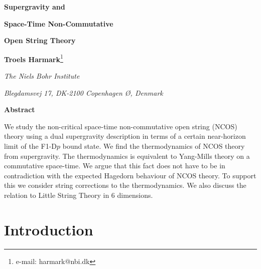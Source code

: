\documentclass[a4paper,twoside,titlepage,12pt]{article}
\begin{document}
\begin{titlepage}

\vskip 2cm

\centerline{\Large \bf Supergravity and}
\vskip 0.2cm
\centerline{\Large \bf Space-Time Non-Commutative}
\vskip 0.2cm
\centerline{\Large \bf Open String Theory}
\vskip 0.2cm

\vskip 1.7cm
\centerline{{\bf Troels Harmark}\footnote{e-mail: harmark@nbi.dk} }
\vskip 0.3cm
\centerline{\sl The Niels Bohr Institute}
\centerline{\sl Blegdamsvej 17, DK-2100 Copenhagen \O, Denmark}
\vskip 2cm
\centerline{\bf Abstract}
\vskip 0.4cm

\noindent

We study the non-critical space-time non-commutative open string  
(NCOS) theory using a dual supergravity description in terms of 
a certain near-horizon limit of the F1-D$p$ bound state.
We find the thermodynamics of NCOS theory from supergravity. 
The thermodynamics is equivalent to Yang-Mills theory 
on a commutative space-time.
We argue that this fact does not have to be in contradiction with the
expected Hagedorn behaviour of NCOS theory. 
To support this we consider string corrections to the thermodynamics.
We also discuss the relation to Little String Theory in 6 dimensions.

\end{titlepage}


\newcommand{\nn}{\nonumber}
\newcommand{\spa}{\ \ ,\ \ \ \ }
\newcommand{\str}{\mathop{{\rm Str}}}
\newcommand{\tr}{\mathop{{\rm Tr}}}
\newcommand{\sn}{\mathop{{\rm sn}}}

\newcommand{\gym}{g_{\mathrm{YM}}}
\newcommand{\geff}{g_{\mathrm{eff}}}
\newcommand{\gseff}{g_s^{\mathrm{eff}}}
\newcommand{\Ord}{{\cal{O}}}
\newcommand{\tlst}{T_{\rm LST}}


\setcounter{page}{1}

\section{Introduction}
\end{document}
